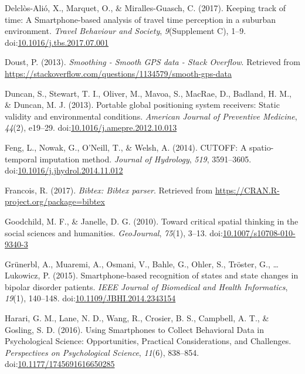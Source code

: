 \documentclass[english,man]{apa6}
\theoremstyle{definition}
\theoremstyle{definition}
\theoremstyle{definition}
\theoremstyle{remark}
\begin{document}
\hypertarget{ref-delclos-alio_keeping_2017}{}
Delclòs-Alió, X., Marquet, O., \& Miralles-Guasch, C. (2017). Keeping
track of time: A Smartphone-based analysis of travel time perception in
a suburban environment. \emph{Travel Behaviour and Society},
\emph{9}(Supplement C), 1--9.
doi:\href{https://doi.org/10.1016/j.tbs.2017.07.001}{10.1016/j.tbs.2017.07.001}

\hypertarget{ref-doust_smoothing_2013}{}
Doust, P. (2013). \emph{Smoothing - Smooth GPS data - Stack Overflow}.
Retrieved from
\url{https://stackoverflow.com/questions/1134579/smooth-gps-data}

\hypertarget{ref-duncan_portable_2013}{}
Duncan, S., Stewart, T. I., Oliver, M., Mavoa, S., MacRae, D., Badland,
H. M., \& Duncan, M. J. (2013). Portable global positioning system
receivers: Static validity and environmental conditions. \emph{American
Journal of Preventive Medicine}, \emph{44}(2), e19--29.
doi:\href{https://doi.org/10.1016/j.amepre.2012.10.013}{10.1016/j.amepre.2012.10.013}

\hypertarget{ref-feng_cutoff:_2014}{}
Feng, L., Nowak, G., O'Neill, T., \& Welsh, A. (2014). CUTOFF: A
spatio-temporal imputation method. \emph{Journal of Hydrology},
\emph{519}, 3591--3605.
doi:\href{https://doi.org/10.1016/j.jhydrol.2014.11.012}{10.1016/j.jhydrol.2014.11.012}

\hypertarget{ref-bibtex}{}
Francois, R. (2017). \emph{Bibtex: Bibtex parser}. Retrieved from
\url{https://CRAN.R-project.org/package=bibtex}

\hypertarget{ref-goodchild_toward_2010}{}
Goodchild, M. F., \& Janelle, D. G. (2010). Toward critical spatial
thinking in the social sciences and humanities. \emph{GeoJournal},
\emph{75}(1), 3--13.
doi:\href{https://doi.org/10.1007/s10708-010-9340-3}{10.1007/s10708-010-9340-3}

\hypertarget{ref-grunerbl_smartphone-based_2015}{}
Grünerbl, A., Muaremi, A., Osmani, V., Bahle, G., Ohler, S., Tröster,
G., \ldots{} Lukowicz, P. (2015). Smartphone-based recognition of states
and state changes in bipolar disorder patients. \emph{IEEE Journal of
Biomedical and Health Informatics}, \emph{19}(1), 140--148.
doi:\href{https://doi.org/10.1109/JBHI.2014.2343154}{10.1109/JBHI.2014.2343154}

\hypertarget{ref-harari_using_2016}{}
Harari, G. M., Lane, N. D., Wang, R., Crosier, B. S., Campbell, A. T.,
\& Gosling, S. D. (2016). Using Smartphones to Collect Behavioral Data
in Psychological Science: Opportunities, Practical Considerations, and
Challenges. \emph{Perspectives on Psychological Science}, \emph{11}(6),
838--854.
doi:\href{https://doi.org/10.1177/1745691616650285}{10.1177/1745691616650285}
\end{document}
